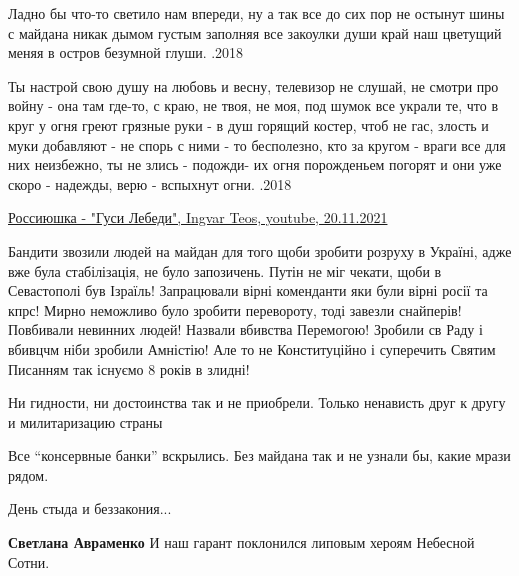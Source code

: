 \begin{itemize}

\begin{multicols}{2}
\obeycr
Ладно бы что-то светило
нам впереди, ну а так
все до сих пор не остынут
шины с майдана никак
\smallskip
дымом густым заполняя
все закоулки души
край наш цветущий меняя
в остров безумной глуши.
.2018
\restorecr
\end{multicols}


\begin{multicols}{2}
\obeycr
Ты настрой свою душу
на любовь и весну,
телевизор не слушай,
не смотри про войну -
\smallskip
она там где-то, с краю,
не твоя, не моя,
под шумок все украли
те, что в круг у огня
\smallskip
греют грязные руки -
в душ горящий костер,
чтоб не гас, злость и муки
добавляют - не спорь
\smallskip
с ними - то бесполезно,
кто за кругом - враги
все для них неизбежно,
ты не злись - подожди-
\smallskip
их огня порожденьем
погорят и они
уже скоро - надежды,
верю - вспыхнут огни.
.2018
\restorecr
\end{multicols}


\href{https://www.youtube.com/watch?v=tegjASN0FvU}{%
Россиюшка - "Гуси Лебеди", Ingvar Teos, youtube, 20.11.2021%
}


Бандити звозили людей на майдан для того щоби зробити розруху в Україні, адже
вже була стабілізація, не було запозичень. Путін не міг чекати, щоби в
Севастополі був Ізраїль! Запрацювали вірні коменданти яки були вірні росії та
кпрс! Мирно неможливо було зробити перевороту, тоді завезли снайперів!
Повбивали невинних людей! Назвали вбивства Перемогою! Зробили св Раду і вбивцчм
ніби зробили Амністію! Але то не Конституційно і суперечить Святим Писанням так
існуємо 8 років в злидні!


Ни гидности, ни достоинства так и не приобрели. Только ненависть друг к другу и милитаризацию страны

Все \enquote{консервные банки} вскрылись. Без майдана так и не узнали бы, какие мрази рядом.

День стыда и беззакония...

\begin{itemize} %
\textbf{Светлана Авраменко} И наш гарант поклонился липовым хероям Небесной Сотни.
\end{itemize} %


\end{itemize}
